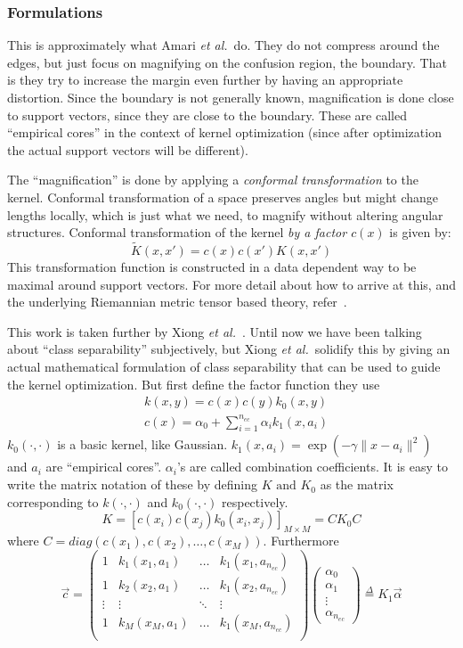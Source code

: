 \documentclass[11pt]{article}
\newcommand{\etal}{{\em et al.}}
\begin{document}
\subsubsection{Formulations}
This is approximately what Amari \etal\ do. They do not compress around the
edges, but just focus on magnifying on the confusion region, the boundary. That
is they try to increase the margin even further by having an appropriate
distortion. Since the boundary is not generally known, magnification is done
close to support vectors, since they are close to the boundary. These are called
``empirical cores'' in the context of kernel optimization (since after
optimization the actual support vectors will be different).\par
The ``magnification'' is done by applying a {\em conformal transformation} to
the kernel. Conformal transformation of a space preserves angles but might
change lengths locally, which is just what we need, to magnify without altering
angular structures. Conformal transformation of the kernel \textit{by a factor
$c(x)$} is given by:
\[\tilde{K}(x,x')=c(x)c(x')K(x,x')\]
This transformation function is constructed in a data dependent way to be
maximal around support vectors. For more detail about how to arrive at this, and
the underlying Riemannian metric tensor based theory, refer~\cite{amari}.\par
This work is taken further by Xiong \etal~\cite{xiong}. Until now we have been
talking about ``class separability'' subjectively, but Xiong \etal\ solidify
this by giving an actual mathematical formulation of class separability that can
be used to guide the kernel optimization. But first define the factor function
they use
\begin{align*}
    &k(x,y)=c(x)c(y)k_0(x,y)\\
    &c(x)=\alpha_0+\sum_{i=1}^{n_{ec}}\alpha_ik_1(x,a_i)
\end{align*}
$k_0(\cdot,\cdot)$ is a basic kernel, like Gaussian.
$k_1(x,a_i)=\exp(-\gamma\lVert x-a_i\rVert^2)$ and $a_i$ are ``empirical
cores''. $\alpha_i$'s are called combination coefficients. It is easy to write
the matrix notation of these by defining $K\text{ and }K_0$ as the matrix
corresponding to $k(\cdot,\cdot)$ and $k_0(\cdot,\cdot)$ respectively.
\[K=[c(x_i)c(x_j)k_0(x_i,x_j)]_{M\times M}=CK_0C\]
where $C=diag(c(x_1),c(x_2),\dotsc,c(x_M))$. Furthermore
\begin{equation}
    \label{eq:alk}
    \vec{c}=\begin{pmatrix}
        1&k_1(x_1,a_1)&\dots&k_1(x_1,a_{n_{ec}})\\
        1&k_2(x_2,a_1)&\dots&k_1(x_2,a_{n_{ec}})\\
        \vdots&\vdots&\ddots&\vdots\\
        1&k_M(x_M,a_1)&\dots&k_1(x_M,a_{n_{ec}})\\
        \end{pmatrix}\begin{pmatrix}
            \alpha_0\\
            \alpha_1\\
            \vdots\\
            \alpha_{n_{ec}}
    \end{pmatrix}\stackrel{\Delta}{=}K_1\vec{\alpha}
\end{equation}
\end{document}
